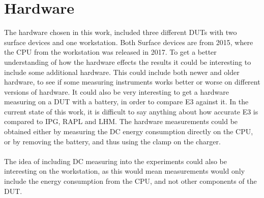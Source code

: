 \section{Hardware}

The hardware chosen in this work, included three different DUTs with two surface devices and one workstation. Both Surface devices are from 2015, where the CPU from the workstation was released in 2017. To get a better understanding of how the hardware effects the results it could be interesting to include some additional hardware. This could include both newer and older hardware, to see if some measuring instruments works better or worse on different versions of hardware. It could also be very interesting to get a hardware measuring on a DUT with a battery, in order to compare E3 against it. In the current state of this work, it is difficult to say anything about how accurate E3 is compared to IPG, RAPL and LHM. The hardware measurements could be obtained either by measuring the DC energy consumption directly on the CPU, or by removing the battery, and thus using the clamp on the charger.

\paragraph*{}
The idea of including DC measuring into the experiments could also be interesting on the workstation, as this would mean measurements would only include the energy consumption from the CPU, and not other components of the DUT.